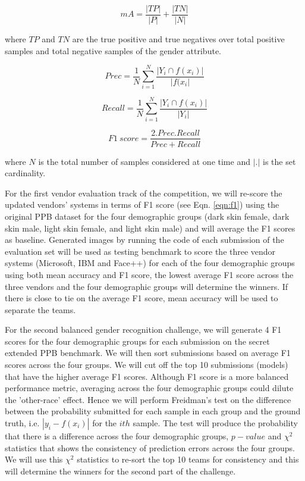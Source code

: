 \documentclass[11pt, oneside]{article}
\begin{document}
\begin{equation}
\label{eqn:ma}
mA =   \frac{|TP|}{|P|} + \frac{|TN|}{|N|} 
\end{equation}

where $TP$ and $TN$ are the true positive and true negatives over total positive samples and total negative samples of the gender attribute.

\begin{equation}
\label{eqn:prec}
Prec =  \frac{1}{N}  \sum_{i=1}^{N}   \frac{|Y_{i} \cap f(x_{i}) |}{|f(x_{i}|}
\end{equation}

\begin{equation}
\label{eqn:rec}
Recall =  \frac{1}{N}  \sum_{i=1}^{N}   \frac{|Y_{i} \cap f(x_{i}) |}{|Y_{i}|} 
\end{equation}

\begin{equation}
\label{eqn:f1}
F1\ score =  \frac{2.Prec.Recall}{Prec+Recall}
\end{equation}

where $N$ is the total number of samples considered at one time and $|.|$ is the set cardinality.

For the first vendor evaluation track of the competition, we will re-score the updated vendors' systems in terms of F1 score (see Eqn. \ref{eqn:f1}) using the original PPB dataset for the four demographic groups (dark skin female, dark skin male, light skin female, and light skin male) and will average the F1 scores as baseline. Generated images by running the code of each submission of the evaluation set will be used as testing benchmark to score the three vendor systems (Microsoft, IBM and Face++) for each of the four demographic groups using both mean accuracy and F1 score, the lowest average F1 score across the three vendors and the four demographic groups will determine the winners. If there is close to tie on the average F1 score, mean accuracy will be used to separate the teams.

For the second balanced gender recognition challenge, we will generate 4 F1 scores for the four demographic groups for each submission on the secret extended PPB benchmark. We will then sort submissions based on average F1 scores across the four groups. We will cut off the top 10 submissions (models) that have the higher average F1 scores. Although F1 score is a more balanced performance metric, averaging across the four demographic groups could dilute the 'other-race' effect. Hence we will perform Freidman's test on the difference between the probability submitted for each sample in each group and the ground truth, i.e. $|y_{i} - f(x_{i})|$ for the $ith$ sample. The test will produce the probability that there is a difference across the four demographic groups, $p-value$ and $\chi^{2}$ statistics that shows the consistency of prediction errors across the four groups. We will use this $\chi^{2}$ statistics to re-sort the top 10 teams for consistency and this will determine the winners for the second part of the challenge.
\end{document}
